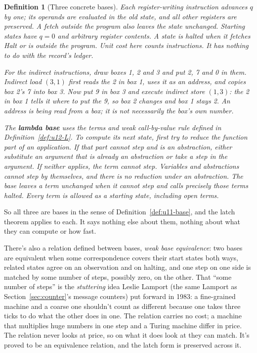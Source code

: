 \documentclass[11pt,twoside]{article}
\theoremstyle{thielethm}
\theoremstyle{thieledef}
\newtheorem{definition}{Definition}[section]
\theoremstyle{thieledef}
\theoremstyle{thieledef}
\theoremstyle{thielethm}
\theoremstyle{thieleobs}
\theoremstyle{thielethm}
\begin{document}
\begin{definition}[Three concrete bases]
Each register-writing instruction advances $q$ by one; its operands are evaluated
in the old state, and all other registers are preserved. A fetch outside the program
also leaves the state unchanged. Starting states have $q=0$ and arbitrary register
contents. A state is halted when it fetches Halt or is outside the program.
Unit cost here counts instructions. It has nothing to do with the record's ledger.

For the indirect instructions, draw boxes 1, 2 and 3 and put 2, 7 and 0 in them.
Indirect load $(3,1)$ first reads the 2 in box 1, uses it as an address, and copies
box 2's 7 into box 3. Now put 9 in box 3 and execute indirect store $(1,3)$:
the 2 in box 1 tells it where to put the 9, so box 2 changes and box 1 stays 2.
An address is being read from a box; it is not necessarily the box's own number.

The \textbf{lambda base} uses the terms and weak call-by-value rule defined in
Definition~\ref{def:u12-L}. To compute its next state, first try to reduce the function
part of an application. If that part cannot step and is an abstraction, either
substitute an argument that is already an abstraction or take a step in the
argument. If neither applies, the term cannot step. Variables and abstractions
cannot step by themselves, and there is no reduction under an abstraction.
The base leaves a term unchanged when it cannot step and calls precisely those
terms halted. Every term is allowed as a starting state, including open terms.
\end{definition}

So all three are bases in the sense of Definition~\ref{def:u11-base}, and the latch theorem
applies to each. It says nothing else about them, nothing about what they can compute or how fast.

There's also a relation defined between bases, \emph{weak base equivalence}: two bases are
equivalent when some correspondence covers their start states both ways, related states agree
on an observation and on halting, and one step on one side is matched by some number of
steps, possibly zero, on the other. That ``some number of steps'' is the \emph{stuttering} idea
Leslie Lamport (the same Lamport as Section~\ref{sec:counter}'s message counters) put forward in 1983: a fine-grained machine and a coarse one shouldn't count as
different because one takes three ticks to do what the other does in one. The relation
carries no cost; a machine that multiplies huge numbers in one step and a Turing machine
differ in price. The relation never looks at price, so on what it does look at they can match. It's proved to be an equivalence relation, and the latch
form is preserved across it.
\end{document}
